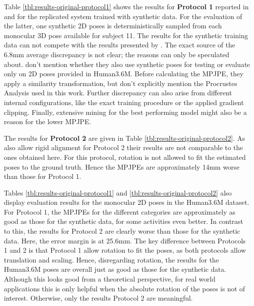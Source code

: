 



Table \ref{tbl:results-original-protocol1} shows the results for \textbf{Protocol 1} reported in \cite{drover18} and for the replicated system trained with synthetic data.
For the evaluation of the latter, one synthetic 2D poses is deterministically sampled from each monocular 3D pose available for subject 11.
The results for the synthetic training data can not compete with the results presented by \citet{drover18}.
The exact source of the 6.8mm average discrepancy is not clear; the reasons can only be speculated about.
\citet{drover18} don't mention whether they also use synthetic poses for testing or evaluate only on 2D poses provided in Human3.6M.
Before calculating the MPJPE, they apply a similarity transformation, but don't explicitly mention the Procrustes Analysis used in this work.
Further discrepancy can also arise from different internal configurations, like the exact training procedure or the applied gradient clipping.
Finally, extensive mining for the best performing model might also be a reason for the lower MPJPE.

The results for \textbf{Protocol 2} are given in Table \ref{tbl:results-original-protocol2}.
As \citet{drover18} also allow rigid alignment for Protocol 2 their results are not comparable to the ones obtained here.
For this protocol, rotation is not allowed to fit the estimated poses to the ground truth.
Hence the MPJPEs are approximately 14mm worse than those for Protocol 1.

Tables \ref{tbl:results-original-protocol1} and \ref{tbl:results-original-protocol2} also display evaluation results for the monocular 2D poses in the Human3.6M dataset.
For Protocol 1, the MPJPEs for the different categories are approximately as good as those for the synthetic data, for some activities even better.
In contrast to this, the results for Protocol 2 are clearly worse than those for the synthetic data.
Here, the error margin is at 25.6mm.
The key difference between Protocols 1 and 2 is that Protocol 1 allow rotation to fit the poses, as both protocols allow translation and scaling.
Hence, disregarding rotation, the results for the Human3.6M poses are overall just as good as those for the synthetic data.
Although this looks good from a theoretical perspective, for real world applications this is only helpful when the absolute rotation of the poses is not of interest.
Otherwise, only the results Protocol 2 are meaningful.

